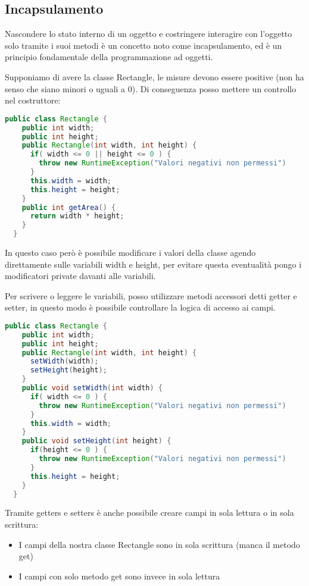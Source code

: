 \documentclass[a4paper,12pt,twoside]{book}
\begin{document}
\subsection{Incapsulamento}
Nascondere lo stato interno di un oggetto e costringere interagire con
l’oggetto solo tramite i suoi metodi è un concetto noto come
incapsulamento, ed è un principio fondamentale della programmazione ad
oggetti.

Supponiamo di avere la classe Rectangle, le misure devono essere
positive (non ha senso che siano minori o uguali a 0). Di conseguenza
posso mettere un controllo nel costruttore:

\begin{lstlisting}[caption={}, label={lst:ConstrControl},
  language=Java]
  public class Rectangle {
    public int width;
    public int height;
    public Rectangle(int width, int height) {
      if( width <= 0 || height <= 0 ) {
        throw new RuntimeException("Valori negativi non permessi")
      }
      this.width = width;
      this.height = height;
    }
    public int getArea() {
      return width * height;
    }
  }
\end{lstlisting}

In questo caso però è possibile modificare i valori della classe
agendo direttamente sulle variabili width e height, per evitare questa
eventualità pongo i modificatori private davanti alle variabili.

Per scrivere o leggere le variabili, posso utilizzare metodi accessori
detti getter e setter, in questo modo è possibile controllare la
logica di accesso ai campi.

\begin{lstlisting}[caption={}, label={lst:ConstrControl2},
  language=Java]
  public class Rectangle {
    public int width;
    public int height;
    public Rectangle(int width, int height) {
      setWidth(width);
      setHeight(height);
    }
    public void setWidth(int width) {
      if( width <= 0 ) {
        throw new RuntimeException("Valori negativi non permessi")
      }
      this.width = width;
    }
    public void setHeight(int height) {
      if(height <= 0 ) {
        throw new RuntimeException("Valori negativi non permessi")
      }
      this.height = height;
    }
  }
\end{lstlisting}

Tramite getters e setters è anche possibile creare campi in sola
lettura o in sola scrittura:
\begin{itemize}
\item I campi della nostra classe Rectangle sono
  in sola scrittura (manca il metodo get)
\item I campi con solo metodo get sono invece in
  sola lettura
\end{itemize}
\end{document}
